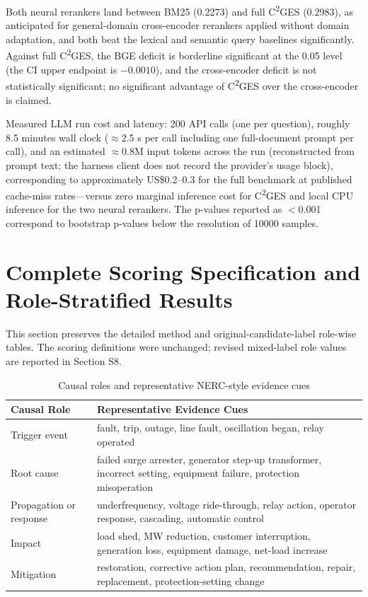 \documentclass[11pt,letterpaper]{article}
\newcommand{\cges}{C\textsuperscript{2}GES}
\begin{document}
Both neural rerankers land between BM25 (0.2273) and full \cges{} (0.2983), as anticipated for general-domain cross-encoder rerankers applied without domain adaptation, and both beat the lexical and semantic query baselines significantly. Against full \cges{}, the BGE deficit is borderline significant at the 0.05 level (the CI upper endpoint is $-0.0010$), and the cross-encoder deficit is not statistically significant; no significant advantage of \cges{} over the cross-encoder is claimed.

Measured LLM run cost and latency: 200 API calls (one per question), roughly 8.5 minutes wall clock ($\approx$2.5 s per call including one full-document prompt per call), and an estimated $\approx$0.8M input tokens across the run (reconstructed from prompt text; the harness client does not record the provider's usage block), corresponding to approximately US\$0.2--0.3 for the full benchmark at published cache-miss rates---versus zero marginal inference cost for \cges{} and local CPU inference for the two neural rerankers. The p-values reported as $<$0.001 correspond to bootstrap p-values below the resolution of 10000 samples.

\section{Complete Scoring Specification and Role-Stratified Results}
\label{sec:s7}

This section preserves the detailed method and original-candidate-label role-wise tables. The scoring definitions were unchanged; revised mixed-label role values are reported in Section S8.

\begin{table}[ht]
\centering
\small
\caption{Causal roles and representative NERC-style evidence cues}
\begin{tabular}{lp{11.5cm}}
\toprule
\textbf{Causal Role} & \textbf{Representative Evidence Cues} \\
\midrule
Trigger event & fault, trip, outage, line fault, oscillation began, relay operated \\
Root cause & failed surge arrester, generator step-up transformer, incorrect setting, equipment failure, protection misoperation \\
Propagation or response & underfrequency, voltage ride-through, relay action, operator response, cascading, automatic control \\
Impact & load shed, MW reduction, customer interruption, generation loss, equipment damage, net-load increase \\
Mitigation & restoration, corrective action plan, recommendation, repair, replacement, protection-setting change \\
\bottomrule
\end{tabular}
\end{table}
\end{document}

